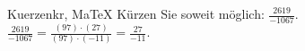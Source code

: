 \begin{MAufgabe}{Kuerzen}{kr, MaTeX}
K\"urzen Sie soweit m\"oglich: $\frac{2619}{-1067}$.\\ 
\ifLsg\MLoesung
\quad $\frac{2619}{-1067}=\frac{(97)\cdot(27)}{(97)\cdot(-11)}=\frac{27}{-11}$.\else\relax\fi
 \end{MAufgabe}